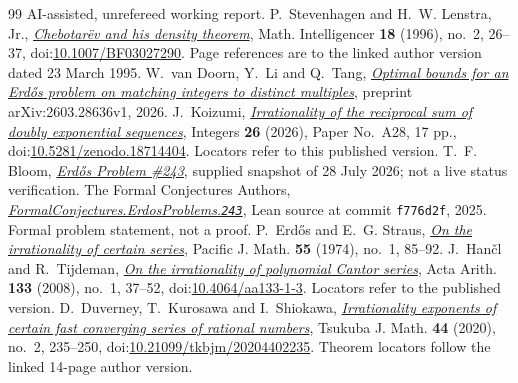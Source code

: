 \begin{thebibliography}{99}
  AI-assisted, unrefereed working report.
 P.~Stevenhagen and H.~W. Lenstra, Jr.,
  \href{https://pub.math.leidenuniv.nl/~lenstrahw/PUBLICATIONS/1994c/art.pdf}
  {\emph{Chebotar\"ev and his density theorem}}, Math. Intelligencer
  \textbf{18} (1996), no.~2, 26--37,
  doi:\href{https://doi.org/10.1007/BF03027290}{10.1007/BF03027290}.
  Page references are to the linked author version dated 23 March 1995.
 W.~van Doorn, Y.~Li and Q.~Tang,
  \href{https://arxiv.org/abs/2603.28636}{\emph{Optimal bounds for an
  Erd\H{o}s problem on matching integers to distinct multiples}},
  preprint arXiv:2603.28636v1, 2026.
 J.~Koizumi,
  \href{https://math.colgate.edu/~integers/aa28/aa28.pdf}
  {\emph{Irrationality of the reciprocal sum of doubly exponential sequences}},
  Integers \textbf{26} (2026), Paper No.~A28, 17 pp.,
  doi:\href{https://doi.org/10.5281/zenodo.18714404}{10.5281/zenodo.18714404}.
  Locators refer to this published version.
 T.~F. Bloom,
  \href{https://www.erdosproblems.com/243}{\emph{Erd\H{o}s Problem \#243}},
  supplied snapshot of 28 July 2026; not a live status verification.
 The Formal Conjectures Authors,
  \href{https://github.com/google-deepmind/formal-conjectures/blob/f776d2f2039351b00737ffcafb9d7d7666e1d9af/FormalConjectures/ErdosProblems/243.lean}
  {\emph{FormalConjectures.ErdosProblems.\texttt{243}}},
  Lean source at commit \texttt{f776d2f}, 2025. Formal problem statement,
  not a proof.
 P.~Erd\H{o}s and E.~G. Straus,
  \href{https://msp.org/pjm/1974/55-1/pjm-v55-n1-p08-s.pdf}
  {\emph{On the irrationality of certain series}}, Pacific J. Math.
  \textbf{55} (1974), no.~1, 85--92.
 J.~Han\v{c}l and R.~Tijdeman,
  \href{https://www.impan.pl/shop/en/publication/transaction/download/product/82186}
  {\emph{On the irrationality of polynomial Cantor series}},
  Acta Arith. \textbf{133} (2008), no.~1, 37--52,
  doi:\href{https://doi.org/10.4064/aa133-1-3}{10.4064/aa133-1-3}.
  Locators refer to the published version.
 D.~Duverney, T.~Kurosawa and I.~Shiokawa,
  \href{https://danielduverney.fr/documents/theorie-des-nombres/Tsukuba.pdf}
  {\emph{Irrationality exponents of certain fast converging series of rational
  numbers}}, Tsukuba J. Math. \textbf{44} (2020), no.~2, 235--250,
  doi:\href{https://doi.org/10.21099/tkbjm/20204402235}{10.21099/tkbjm/20204402235}.
  Theorem locators follow the linked 14-page author version.

\end{thebibliography}
